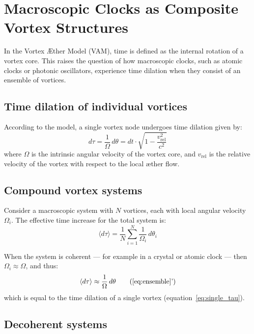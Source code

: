 \section{Macroscopic Clocks as Composite Vortex Structures}

In the Vortex Æther Model (VAM), time is defined as the internal rotation of a vortex core. This raises the question of how macroscopic clocks, such as atomic clocks or photonic oscillators, experience time dilation when they consist of an ensemble of vortices.

\subsection*{Time dilation of individual vortices}

According to the model, a single vortex node undergoes time dilation given by:
\begin{equation}
d\tau = \frac{1}{\Omega} \, d\theta = dt \cdot \sqrt{1 - \frac{v_{\text{rel}}^2}{c^2}} \label{eq:single_tau}
\end{equation}
where \( \Omega \) is the intrinsic angular velocity of the vortex core, and \( v_{\text{rel}} \) is the relative velocity of the vortex with respect to the local æther flow.

\subsection*{Compound vortex systems}

Consider a macroscopic system with \( N \) vortices, each with local angular velocity \( \Omega_i \). The effective time increase for the total system is:
\begin{equation}
\langle d\tau \rangle = \frac{1}{N} \sum_{i=1}^{N} \frac{1}{\Omega_i} \, d\theta_i \label{eq:ensemble}
\end{equation}

When the system is coherent — for example in a crystal or atomic clock — then \( \Omega_i \approx \Omega \), and thus:
\begin{equation}
\langle d\tau \rangle \approx \frac{1}{\Omega} \, d\theta \tag{\ref{eq:ensemble}'}
\end{equation}
which is equal to the time dilation of a single vortex (equation~\ref{eq:single_tau}).

\subsection*{Decoherent systems}

